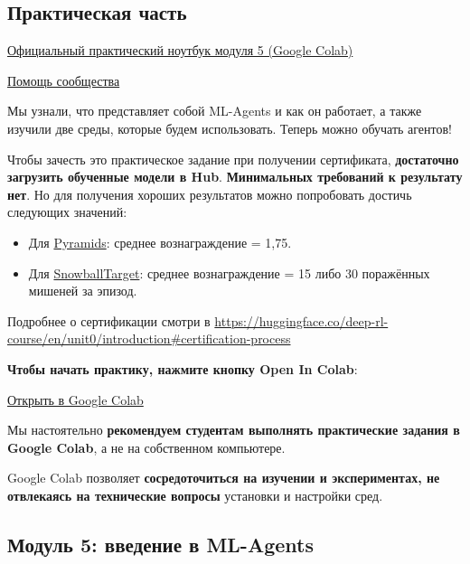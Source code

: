 \documentclass[11pt,a4paper]{article}
\begin{document}
\subsection{Практическая часть}\label{hands-on}

\href{https://colab.research.google.com/github/huggingface/deep-rl-class/blob/main/notebooks/unit5/unit5.ipynb}{Официальный практический ноутбук модуля 5 (Google Colab)}

\href{http://hf.co/join/discord}{Помощь сообщества}

Мы узнали, что представляет собой ML-Agents и как он работает, а также изучили две среды, которые будем использовать. Теперь можно обучать агентов!


Чтобы зачесть это практическое задание при получении сертификата, \textbf{достаточно загрузить обученные модели в Hub}. \textbf{Минимальных требований к результату нет}. Но для получения хороших результатов можно попробовать достичь следующих значений:

\begin{itemize}
\tightlist
\item
  Для \href{https://huggingface.co/spaces/unity/ML-Agents-Pyramids}{Pyramids}: среднее вознаграждение = 1,75.
\item
  Для \href{https://huggingface.co/spaces/ThomasSimonini/ML-Agents-SnowballTarget}{SnowballTarget}: среднее вознаграждение = 15 либо 30 поражённых мишеней за эпизод.
\end{itemize}

Подробнее о сертификации смотри в \url{https://huggingface.co/deep-rl-course/en/unit0/introduction#certification-process}

\textbf{Чтобы начать практику, нажмите кнопку Open In Colab}:

\href{https://colab.research.google.com/github/huggingface/deep-rl-class/blob/master/notebooks/unit5/unit5.ipynb}{Открыть в Google Colab}

Мы настоятельно \textbf{рекомендуем студентам выполнять практические задания в Google Colab}, а не на собственном компьютере.

Google Colab позволяет \textbf{сосредоточиться на изучении и экспериментах, не отвлекаясь на технические вопросы} установки и настройки сред.

\subsection{Модуль 5: введение в ML-Agents}\label{unit-5-an-introduction-to-ml-agents}
\end{document}
